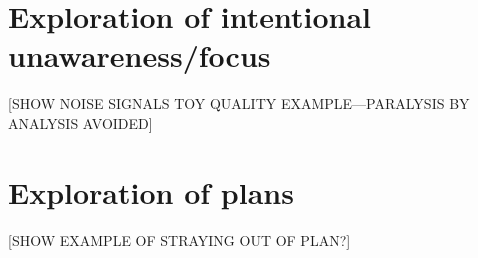 \documentclass[
11pt,
titlepage,
reqno,
]{article}%
\newtheorem{condition}{Condition}
\theoremstyle{definition}
\begin{document}
\section{Exploration of intentional unawareness/focus}
[SHOW NOISE SIGNALS TOY QUALITY EXAMPLE---PARALYSIS BY ANALYSIS AVOIDED]

\section{Exploration of plans}
[SHOW EXAMPLE OF STRAYING OUT OF PLAN?]










%	
%	
\end{document}
